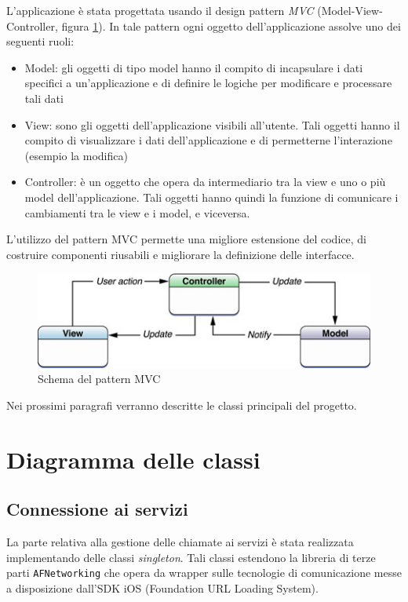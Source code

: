 L'applicazione è stata progettata usando il design pattern \emph{MVC} (Model-View-Controller, figura \ref{fig:mvc}). In tale pattern ogni oggetto dell'applicazione assolve uno dei seguenti ruoli:
\begin{itemize}
 \item Model: gli oggetti di tipo model hanno il compito di incapsulare i dati specifici a un'applicazione e di definire le logiche per modificare e processare tali dati
 \item View: sono gli oggetti dell'applicazione visibili all'utente. Tali oggetti hanno il compito di visualizzare i dati dell'applicazione e di permetterne l'interazione (esempio la modifica)
 \item Controller: è un oggetto che opera da intermediario tra la view e uno o più model dell'applicazione. Tali oggetti hanno quindi la funzione di comunicare i cambiamenti tra le view e i model, e viceversa.
\end{itemize}

L'utilizzo del pattern MVC permette una migliore estensione del codice, di costruire componenti riusabili e migliorare la definizione delle interfacce.

\begin{figure}[!htbp]
\centering
\includegraphics[scale=0.70]{architettura/mvc.png}
\caption{Schema del pattern MVC}
\label{fig:mvc}
\end{figure}

Nei prossimi paragrafi verranno descritte le classi principali del progetto.

\section{Diagramma delle classi}

\subsection{Connessione ai servizi}
\label{parag:networking}
La parte relativa alla gestione delle chiamate ai servizi è stata realizzata implementando delle classi \emph{singleton}. Tali classi estendono la libreria di terze parti \texttt{AFNetworking} che opera da wrapper sulle tecnologie di comunicazione messe a disposizione dall'SDK iOS (Foundation URL Loading System). 

